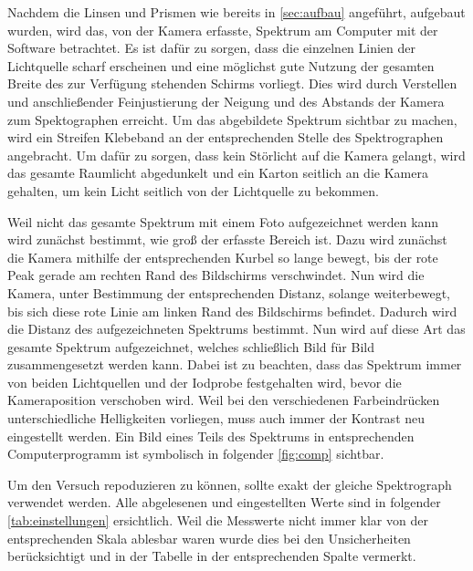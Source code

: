 \documentclass[12pt,english,ngerman]{scrartcl}
\begin{document}
Nachdem die Linsen und Prismen wie bereits in \autoref{sec:aufbau} angeführt, aufgebaut wurden,
wird das, von der Kamera erfasste, Spektrum am Computer mit der Software
betrachtet. Es ist dafür zu sorgen, dass die einzelnen Linien der Lichtquelle scharf erscheinen und
eine möglichst gute Nutzung der gesamten Breite des zur Verfügung stehenden Schirms vorliegt. Dies wird durch
Verstellen und anschließender Feinjustierung der Neigung und des Abstands der Kamera zum Spektographen 
erreicht. Um das abgebildete Spektrum sichtbar zu machen, wird ein Streifen Klebeband an der entsprechenden Stelle
des Spektrographen angebracht. Um dafür zu sorgen, dass kein Störlicht auf die Kamera gelangt, wird das gesamte
Raumlicht abgedunkelt und ein Karton seitlich an die Kamera gehalten, um kein Licht seitlich von der Lichtquelle zu bekommen.

Weil nicht das gesamte Spektrum mit einem Foto aufgezeichnet werden kann wird zunächst bestimmt, wie groß der 
erfasste Bereich ist. Dazu wird zunächst die Kamera mithilfe der entsprechenden Kurbel so lange bewegt, bis der
rote Peak gerade am rechten Rand des Bildschirms verschwindet. Nun wird die Kamera, unter Bestimmung der entsprechenden 
Distanz, solange weiterbewegt, bis sich diese rote Linie am linken Rand des Bildschirms befindet. Dadurch wird die 
Distanz des aufgezeichneten Spektrums bestimmt. Nun wird auf diese Art das gesamte Spektrum aufgezeichnet, welches
schließlich Bild für Bild zusammengesetzt werden kann. Dabei ist zu beachten, dass das Spektrum immer von beiden 
Lichtquellen und der Iodprobe festgehalten wird, bevor die Kameraposition verschoben wird. Weil bei den verschiedenen 
Farbeindrücken unterschiedliche Helligkeiten vorliegen, muss auch immer der Kontrast neu eingestellt werden.
Ein Bild eines Teils des Spektrums in entsprechenden Computerprogramm ist symbolisch in folgender \autoref{fig:comp} sichtbar.



Um den Versuch repoduzieren zu können, sollte exakt der gleiche Spektrograph verwendet werden. Alle abgelesenen und 
eingestellten Werte sind in folgender \autoref{tab:einstellungen} ersichtlich. Weil die Messwerte nicht immer klar
von der entsprechenden Skala ablesbar waren wurde dies bei den Unsicherheiten berücksichtigt und in der Tabelle in der
entsprechenden Spalte vermerkt.
\end{document}
